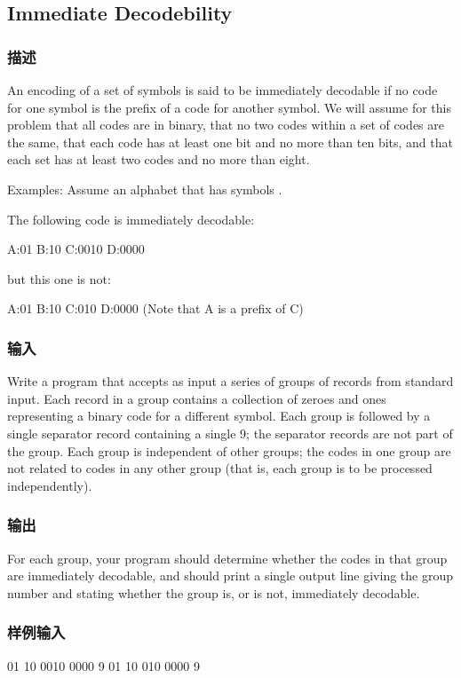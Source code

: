 \subsection{Immediate Decodebility}


\subsubsection{描述}
An encoding of a set of symbols is said to be immediately decodable if no code for one symbol is the prefix of a code for another symbol. We will assume for this problem that all codes are in binary, that no two codes within a set of codes are the same, that each code has at least one bit and no more than ten bits, and that each set has at least two codes and no more than eight. 

Examples: Assume an alphabet that has symbols .

The following code is immediately decodable: 
\begin{Code}
A:01 B:10 C:0010 D:0000 
\end{Code}

but this one is not: 
\begin{Code}
A:01 B:10 C:010 D:0000 (Note that A is a prefix of C) 
\end{Code}


\subsubsection{输入}
Write a program that accepts as input a series of groups of records from standard input. Each record in a group contains a collection of zeroes and ones representing a binary code for a different symbol. Each group is followed by a single separator record containing a single 9; the separator records are not part of the group. Each group is independent of other groups; the codes in one group are not related to codes in any other group (that is, each group is to be processed independently).


\subsubsection{输出}
For each group, your program should determine whether the codes in that group are immediately decodable, and should print a single output line giving the group number and stating whether the group is, or is not, immediately decodable.

\subsubsection{样例输入}
\begin{Code}
01
10
0010
0000
9
01
10
010
0000
9
\end{Code}

